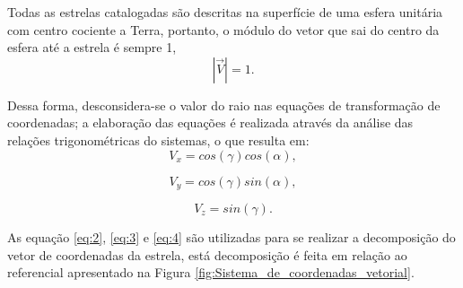 Todas as estrelas catalogadas são descritas na superfície de uma esfera unitária  com centro cociente a Terra, 
portanto, o módulo do vetor que sai do centro da esfera até a estrela é sempre 1,
\begin{equation}
	\left| \overrightarrow{V}\right|=1.
	\label{eq:1}
\end{equation}

Dessa forma, desconsidera-se o valor do raio nas equações de transformação de coordenadas; 
a elaboração das equações é realizada através da análise das relações trigonométricas do sistemas, 
o que resulta em:
\begin{equation}
	V_{x}=cos(\gamma)cos(\alpha),
	\label{eq:2}
\end{equation}

\begin{equation}
	V_{y}=cos(\gamma)sin(\alpha),
	\label{eq:3}
\end{equation}

\begin{equation}
	V_{z}=sin(\gamma).
	\label{eq:4}
\end{equation}

As equação \ref{eq:2}, \ref{eq:3} e \ref{eq:4} são utilizadas para se realizar a decomposição do vetor de coordenadas da estrela, 
está decomposição é feita em relação ao referencial apresentado na Figura \ref{fig:Sistema_de_coordenadas_vetorial}.